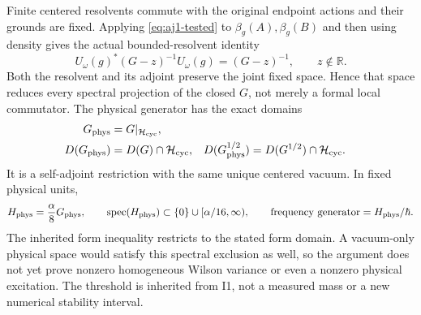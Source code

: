 Finite centered resolvents commute with the original endpoint actions and their grounds are fixed. Applying \eqref{eq:aj1-tested} to $\beta_g(A),\beta_g(B)$ and then using density gives the actual bounded-resolvent identity
\begin{equation}
 U_\omega(g)^*(G-z)^{-1}U_\omega(g)=(G-z)^{-1},
 \qquad z\notin\mathbb R.
 \label{eq:aj1-resolvent}
\end{equation}
Both the resolvent and its adjoint preserve the joint fixed space. Hence that space reduces every spectral projection of the closed $G$, not merely a formal local commutator. The physical generator has the exact domains
\begin{align}
 G_{\rm phys}&=G|_{\mathcal H_{\rm cyc}},\notag\\
 D(G_{\rm phys})&=D(G)\cap\mathcal H_{\rm cyc},
 &D(G_{\rm phys}^{1/2})&=D(G^{1/2})\cap\mathcal H_{\rm cyc}.
 \label{eq:aj1-domains}
\end{align}
It is a self-adjoint restriction with the same unique centered vacuum. In fixed physical units,
\begin{equation}
 H_{\rm phys}=\frac\alpha8G_{\rm phys},\qquad
 \operatorname{spec}(H_{\rm phys})\subset\{0\}\cup[\alpha/16,\infty),
 \qquad\text{frequency generator}=H_{\rm phys}/\hbar.
\end{equation}
The inherited form inequality restricts to the stated form domain. A vacuum-only physical space would satisfy this spectral exclusion as well, so the argument does not yet prove nonzero homogeneous Wilson variance or even a nonzero physical excitation. The threshold is inherited from I1, not a measured mass or a new numerical stability interval.

